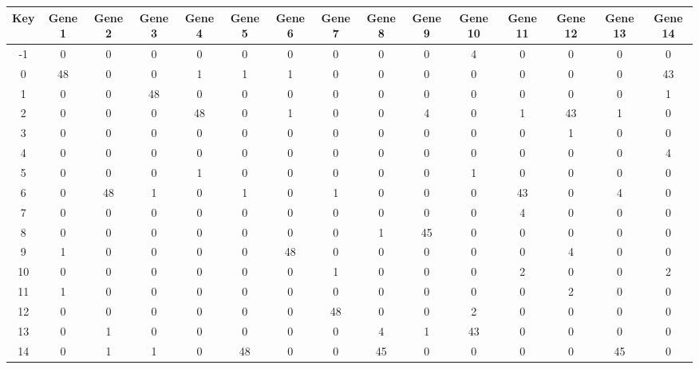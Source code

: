 \begin{tabular}{|c|c|c|c|c|c|c|c|c|c|c|c|c|c|c|}
\hline
Key & Gene 1 & Gene 2 & Gene 3 & Gene 4 & Gene 5 & Gene 6 & Gene 7 & Gene 8 & Gene 9 & Gene 10 & Gene 11 & Gene 12 & Gene 13 & Gene 14 \\
\hline
-1 & 0 & 0 & 0 & 0 & 0 & 0 & 0 & 0 & 0 & 4 & 0 & 0 & 0 & 0 \\
0 & 48 & 0 & 0 & 1 & 1 & 1 & 0 & 0 & 0 & 0 & 0 & 0 & 0 & 43 \\
1 & 0 & 0 & 48 & 0 & 0 & 0 & 0 & 0 & 0 & 0 & 0 & 0 & 0 & 1 \\
2 & 0 & 0 & 0 & 48 & 0 & 1 & 0 & 0 & 4 & 0 & 1 & 43 & 1 & 0 \\
3 & 0 & 0 & 0 & 0 & 0 & 0 & 0 & 0 & 0 & 0 & 0 & 1 & 0 & 0 \\
4 & 0 & 0 & 0 & 0 & 0 & 0 & 0 & 0 & 0 & 0 & 0 & 0 & 0 & 4 \\
5 & 0 & 0 & 0 & 1 & 0 & 0 & 0 & 0 & 0 & 1 & 0 & 0 & 0 & 0 \\
6 & 0 & 48 & 1 & 0 & 1 & 0 & 1 & 0 & 0 & 0 & 43 & 0 & 4 & 0 \\
7 & 0 & 0 & 0 & 0 & 0 & 0 & 0 & 0 & 0 & 0 & 4 & 0 & 0 & 0 \\
8 & 0 & 0 & 0 & 0 & 0 & 0 & 0 & 1 & 45 & 0 & 0 & 0 & 0 & 0 \\
9 & 1 & 0 & 0 & 0 & 0 & 48 & 0 & 0 & 0 & 0 & 0 & 4 & 0 & 0 \\
10 & 0 & 0 & 0 & 0 & 0 & 0 & 1 & 0 & 0 & 0 & 2 & 0 & 0 & 2 \\
11 & 1 & 0 & 0 & 0 & 0 & 0 & 0 & 0 & 0 & 0 & 0 & 2 & 0 & 0 \\
12 & 0 & 0 & 0 & 0 & 0 & 0 & 48 & 0 & 0 & 2 & 0 & 0 & 0 & 0 \\
13 & 0 & 1 & 0 & 0 & 0 & 0 & 0 & 4 & 1 & 43 & 0 & 0 & 0 & 0 \\
14 & 0 & 1 & 1 & 0 & 48 & 0 & 0 & 45 & 0 & 0 & 0 & 0 & 45 & 0 \\
\hline
\end{tabular}
